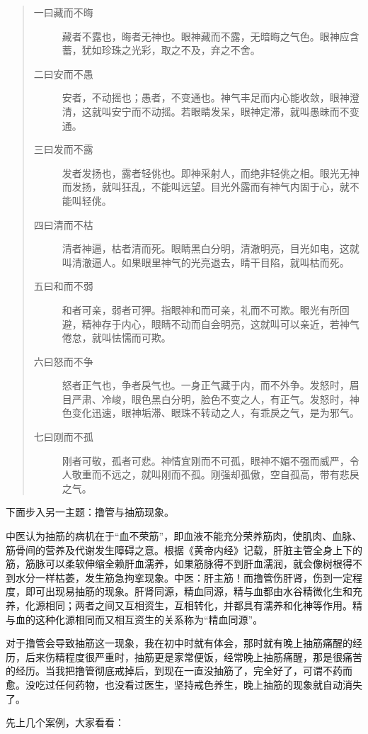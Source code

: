 \documentclass{ctexart}
\begin{document}
\begin{quotation}
    \begin{description}
        \item[一曰藏而不晦] 藏者不露也，晦者无神也。眼神藏而不露，无暗晦之气色。眼神应含蓄，犹如珍珠之光彩，取之不及，弃之不舍。
        \item[二曰安而不愚] 安者，不动摇也；愚者，不变通也。神气丰足而内心能收敛，眼神澄清，这就叫安宁而不动摇。若眼睛发呆，眼神定滞，就叫愚昧而不变通。
        \item[三曰发而不露] 发者发扬也，露者轻佻也。即神采射人，而绝非轻佻之相。眼光无神而发扬，就叫狂乱，不能叫远望。目光外露而有神气内固于心，就不能叫轻佻。
        \item[四曰清而不枯] 清者神逼，枯者清而死。眼睛黑白分明，清澈明亮，目光如电，这就叫清澈逼人。如果眼里神气的光亮退去，睛干目陷，就叫枯而死。
        \item[五曰和而不弱] 和者可亲，弱者可狎。指眼神和而可亲，礼而不可欺。眼光有所回避，精神存于内心，眼睛不动而自会明亮，这就叫可以亲近，若神气倦怠，就叫怯懦而可欺。
        \item[六曰怒而不争] 怒者正气也，争者戾气也。一身正气藏于内，而不外争。发怒时，眉目严肃、冷峻，眼色黑白分明，脸色不变之人，有正气。发怒时，神色变化迅速，眼神垢滞、眼珠不转动之人，有乖戾之气，是为邪气。
        \item[七曰刚而不孤] 刚者可敬，孤者可悲。神情宜刚而不可孤，眼神不媚不强而威严，令人敬重而不远之，就叫刚而不孤。刚强却孤傲，空自孤高，带有悲戾之气。
    \end{description}
\end{quotation}

下面步入另一主题：撸管与抽筋现象。

中医认为抽筋的病机在于“血不荣筋”，即血液不能充分荣养筋肉，使肌肉、血脉、筋骨间的营养及代谢发生障碍之意。根据《黄帝内经》记载，肝脏主管全身上下的筋，筋脉可以柔软伸缩全赖肝血濡养，如果筋脉得不到肝血濡润，就会像树根得不到水分一样枯萎，发生筋急拘挛现象。中医：肝主筋！而撸管伤肝肾，伤到一定程度，即可出现易抽筋的现象。肝肾同源，精血同源，精与血都由水谷精微化生和充养，化源相同；两者之间又互相资生，互相转化，并都具有濡养和化神等作用。精与血的这种化源相同而又相互资生的关系称为“精血同源”。

对于撸管会导致抽筋这一现象，我在初中时就有体会，那时就有晚上抽筋痛醒的经历，后来伤精程度很严重时，抽筋更是家常便饭，经常晚上抽筋痛醒，那是很痛苦的经历。当我把撸管彻底戒掉后，到现在一直没抽筋了，完全好了，可谓不药而愈。没吃过任何药物，也没看过医生，坚持戒色养生，晚上抽筋的现象就自动消失了。

先上几个案例，大家看看：
\end{document}
